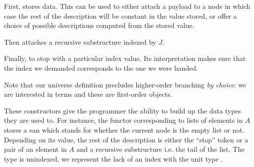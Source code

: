 \noindent\begin{minipage}{0.5\textwidth}
\end{minipage}\begin{minipage}{0.5\textwidth}
\end{minipage}

First,  stores data. This can be used to either attach a payload
to a node in which case the rest of the description will be constant in
the value stored, or offer a choice of possible descriptions computed
from the stored value.

\noindent\begin{minipage}[t]{0.5\textwidth}
\end{minipage}\begin{minipage}[t]{0.5\textwidth}
\end{minipage}

Then  attaches a recursive substructure indexed by $J$.

\noindent\begin{minipage}{0.5\textwidth}
\end{minipage}\begin{minipage}{0.5\textwidth}
\end{minipage}

Finally,  to stop with a particular index value.
Its interpretation makes sure that the index we demanded corresponds
to the one we were handed.

\noindent\begin{minipage}{0.5\textwidth}
\end{minipage}\begin{minipage}{0.5\textwidth}
\end{minipage}

Note that our universe definition precludes higher-order branching
\emph{by choice}: we are interested in terms and these are first-order
objects.

These constructors give the programmer the ability to build up the data
types they are used to. For instance, the functor corresponding
to lists of elements in $A$ stores a ean which stands for whether
the current node is the empty list or not. Depending on its value, the
rest of the description is either the ``stop'' token or a pair of an element
in $A$ and a recursive substructure i.e. the tail of the list.
The  type is unindexed, we represent the lack of an index with
the unit type \AD{$\top$}.

